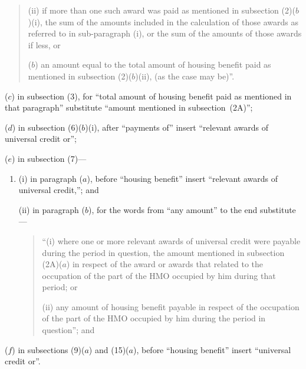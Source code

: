 \documentclass[12pt,a4paper]{article}
\begin{document}
\begin{enumerate}
\begin{quotation}
\begin{enumerate}
\begin{enumerate}
(ii) if more than one such award was paid as mentioned in subsection (2)($b$)(i), the sum of the amounts included in the calculation of those awards as referred to in sub-paragraph (i), or the sum of the amounts of those awards if less, or
\end{enumerate}

($b$) an amount equal to the total amount of housing benefit paid as mentioned in subsection (2)($b$)(ii), (as the case may be)”.
\end{enumerate}
\end{quotation}

($c$) in subsection (3), for “total amount of housing benefit paid as mentioned in that paragraph” substitute “amount mentioned in subsection~(2A)”;

($d$) in subsection (6)($b$)(i), after “payments of” insert “relevant awards of universal credit or”;

($e$) in subsection (7)—
\begin{enumerate}\item[]
(i) in paragraph ($a$), before “housing benefit” insert “relevant awards of universal credit,”; and

(ii) in paragraph ($b$), for the words from “any amount” to the end substitute—
\begin{quotation}
“(i) where one or more relevant awards of universal credit were payable during the period in question, the amount mentioned in subsection (2A)($a$)  in respect of the award or awards that related to the occupation of the part of the HMO occupied by him during that period; or

(ii) any amount of housing benefit payable in respect of the occupation of the part of the HMO occupied by him during the period in question”; and
\end{quotation}
\end{enumerate}

($f$) in subsections (9)($a$)  and (15)($a$), before “housing benefit” insert “universal credit or”.
\end{enumerate}
\end{document}
